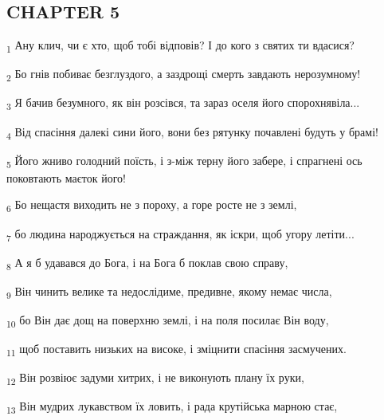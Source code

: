 \subsection{CHAPTER 5}
\begin{tcolorbox}
\textsubscript{1} Ану клич, чи є хто, щоб тобі відповів? І до кого з святих ти вдасися?
\end{tcolorbox}
\begin{tcolorbox}
\textsubscript{2} Бо гнів побиває безглуздого, а заздрощі смерть завдають нерозумному!
\end{tcolorbox}
\begin{tcolorbox}
\textsubscript{3} Я бачив безумного, як він розсівся, та зараз оселя його спорохнявіла...
\end{tcolorbox}
\begin{tcolorbox}
\textsubscript{4} Від спасіння далекі сини його, вони без рятунку почавлені будуть у брамі!
\end{tcolorbox}
\begin{tcolorbox}
\textsubscript{5} Його жниво голодний поїсть, і з-між терну його забере, і спрагнені ось поковтають маєток його!
\end{tcolorbox}
\begin{tcolorbox}
\textsubscript{6} Бо нещастя виходить не з пороху, а горе росте не з землі,
\end{tcolorbox}
\begin{tcolorbox}
\textsubscript{7} бо людина народжується на страждання, як іскри, щоб угору летіти...
\end{tcolorbox}
\begin{tcolorbox}
\textsubscript{8} А я б удавався до Бога, і на Бога б поклав свою справу,
\end{tcolorbox}
\begin{tcolorbox}
\textsubscript{9} Він чинить велике та недослідиме, предивне, якому немає числа,
\end{tcolorbox}
\begin{tcolorbox}
\textsubscript{10} бо Він дає дощ на поверхню землі, і на поля посилає Він воду,
\end{tcolorbox}
\begin{tcolorbox}
\textsubscript{11} щоб поставить низьких на високе, і зміцнити спасіння засмучених.
\end{tcolorbox}
\begin{tcolorbox}
\textsubscript{12} Він розвіює задуми хитрих, і не виконують плану їх руки,
\end{tcolorbox}
\begin{tcolorbox}
\textsubscript{13} Він мудрих лукавством їх ловить, і рада крутійська марною стає,
\end{tcolorbox}
